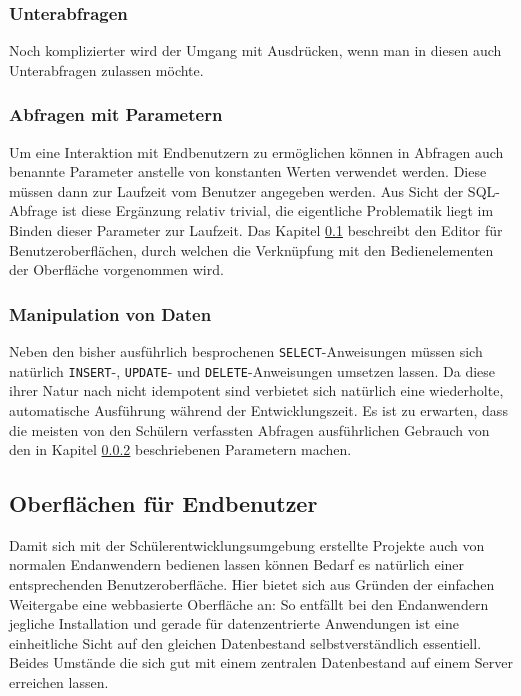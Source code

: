 \documentclass[paper=a4,fontsize=11pt,parskip=half]{scrartcl}
\begin{document}
\subsubsection{Unterabfragen}

Noch komplizierter wird der Umgang mit Ausdrücken, wenn man in diesen auch Unterabfragen zulassen möchte.


\subsubsection{Abfragen mit Parametern}
\label{sec:design-query-params}

Um eine Interaktion mit Endbenutzern zu ermöglichen können in Abfragen auch benannte Parameter anstelle von konstanten Werten verwendet werden. Diese müssen dann zur Laufzeit vom Benutzer angegeben werden. Aus Sicht der SQL-Abfrage ist diese Ergänzung relativ trivial, die eigentliche Problematik liegt im Binden dieser Parameter zur Laufzeit. Das Kapitel \ref{sec:design-ui-editor} beschreibt den Editor für Benutzeroberflächen, durch welchen die Verknüpfung mit den Bedienelementen der Oberfläche vorgenommen wird.

\subsubsection{Manipulation von Daten}

Neben den bisher ausführlich besprochenen \texttt{SELECT}-Anweisungen müssen sich natürlich \texttt{INSERT}-, \texttt{UPDATE}- und \texttt{DELETE}-Anweisungen umsetzen lassen. Da diese ihrer Natur nach nicht idempotent sind verbietet sich natürlich eine wiederholte, automatische Ausführung während der Entwicklungszeit. Es ist zu erwarten, dass die meisten von den Schülern verfassten Abfragen ausführlichen Gebrauch von den in Kapitel \ref{sec:design-query-params} beschriebenen Parametern machen.

\subsection{Oberflächen für Endbenutzer}
\label{sec:design-ui-editor}

Damit sich mit der Schülerentwicklungsumgebung erstellte Projekte auch von normalen Endanwendern bedienen lassen können Bedarf es natürlich einer entsprechenden Benutzeroberfläche. Hier bietet sich aus Gründen der einfachen Weitergabe eine webbasierte Oberfläche an: So entfällt bei den Endanwendern jegliche Installation und gerade für datenzentrierte Anwendungen ist eine einheitliche Sicht auf den gleichen Datenbestand selbstverständlich essentiell. Beides Umstände die sich gut mit einem zentralen Datenbestand auf einem Server erreichen lassen.
\end{document}
